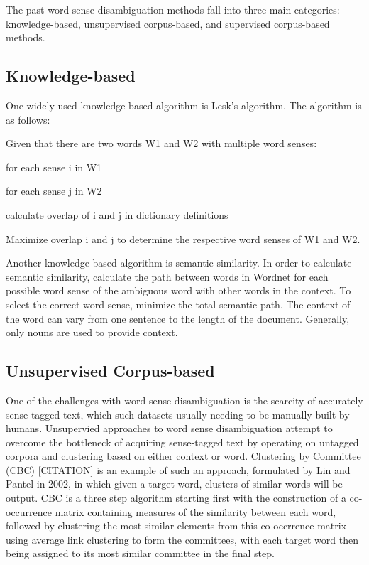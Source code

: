 \documentclass[10pt, letterpaper]{article}
\begin{document}
        The past word sense disambiguation methods fall into three main categories: knowledge-based, unsupervised corpus-based, and supervised corpus-based methods.

	\subsection{Knowledge-based}

        One widely used knowledge-based algorithm is Lesk's algorithm.  The algorithm is as follows: 

        Given that there are two words W1 and W2 with multiple word senses:

	for each sense i in W1

	\indent \indent for each sense j in W2

	\indent \indent \indent calculate overlap of i and j in dictionary definitions

	Maximize overlap i and j to determine the respective word senses of W1 and W2.
	
        Another knowledge-based algorithm is semantic similarity.  In order to calculate semantic similarity, calculate the path between words in Wordnet for each possible word sense of the ambiguous word with other words in the context.  To select the correct word sense, minimize the total semantic path.  The context of the word can vary from one sentence to the length of the document.  Generally, only nouns are used to provide context. 
	
	\subsection{Unsupervised Corpus-based}
	One of the challenges with word sense disambiguation is the scarcity of accurately sense-tagged text, which such datasets usually needing
	to be manually built by humans. Unsupervied approaches to word sense disambiguation attempt to overcome the bottleneck of acquiring sense-tagged
	text by operating on untagged corpora and clustering based on either context or word. Clustering by Committee (CBC) [CITATION] is an example of
	such an approach, formulated by Lin and Pantel in 2002, in which given a target word, clusters of similar words will be output. CBC is a
	three step algorithm starting first with the construction of a co-occurrence matrix containing measures of the similarity between each word,
	followed by clustering the most similar elements from this co-occrrence matrix using average link clustering to form the committees, with each
	target word then being assigned to its most similar committee in the final step.
	
\end{document}

